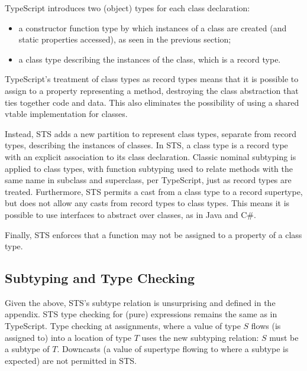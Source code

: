 TypeScript introduces two (object) types for each class declaration:
\begin{itemize}
\item a constructor function type by which instances of a class
are created (and static properties accessed), as seen in the previous section;
\item a class type describing the instances of the class, which is a record type.
\end{itemize}
TypeScript's treatment of class types as record types
means that it is possible to assign to a property representing a method,
destroying the class abstraction that ties together code and data.
This also eliminates the possibility of using a shared vtable implementation for classes.

Instead, STS adds a new partition to represent class types, separate from record types,
describing the instances of classes. In STS, a class type is a
record type with an explicit association to its class declaration.
Classic nominal subtyping is applied to class types, with function subtyping used to relate methods with
the same name in subclass and superclass, per TypeScript, just as record types are treated.
Furthermore, STS permits a cast from a class type
to a record supertype, but does not allow any casts from record types to class types. This means
it is possible to use interfaces to abstract over classes, as in Java and C\#.

Finally, STS enforces that a function may not be assigned to a property of a class type.

\subsection{Subtyping and Type Checking}

Given the above, STS's subtype relation is unsurprising and defined in the appendix.
STS type checking for (pure) expressions remains the same as in TypeScript.
Type checking at assignments, where a value of type $S$ flows (is assigned to)
into a location of type $T$ uses the new subtyping relation: $S$
must be a subtype of $T$.  Downcasts (a value of supertype flowing to where a subtype
is expected) are not permitted in STS.



